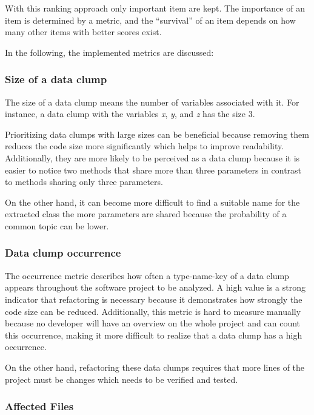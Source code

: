 With this ranking approach only important item are kept. The importance of an item is determined by a metric, and the \enquote{survival} of an item depends on how many other items with better scores exist.

In the following, the implemented metrics are discussed:

\subsubsection{Size of a data clump}

The size of a data clump means the number of variables associated with it. For instance, a data clump with the variables \textit{x}, \textit{y}, and \textit{z} has the size 3. 

Prioritizing data clumps with large sizes can be beneficial because removing them reduces the code size more significantly which helps to improve readability. Additionally, they are more likely to be perceived as a data clump because it is easier to notice two methods that share more than three parameters in contrast to methods sharing only three parameters. 

On the other hand,  it can become more difficult to find a suitable name for the extracted class the more parameters are shared because the probability of a common topic can be lower. 

\subsubsection{Data clump occurrence}

The occurrence metric describes how often a type-name-key of a data clump appears throughout the software project to be analyzed. A high value is a strong indicator that refactoring is necessary because it demonstrates how strongly the code size can be reduced. Additionally, this metric is hard to measure manually because no developer will have an overview on the whole project and can count this occurrence, making it more difficult to realize that a data clump has a high occurrence.  

On the other hand, refactoring these data clumps requires that more lines of the project must be changes which needs to be verified and tested. 

\subsubsection{Affected Files}

